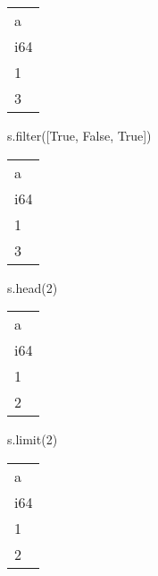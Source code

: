 \documentclass[
  letterpaper,
  DIV=11,
  numbers=noendperiod]{scrartcl}
\newenvironment{Shaded}{\begin{snugshade}}{\end{snugshade}}
\newcommand{\BuiltInTok}[1]{\textcolor[rgb]{0.00,0.23,0.31}{#1}}
\newcommand{\DecValTok}[1]{\textcolor[rgb]{0.68,0.00,0.00}{#1}}
\newcommand{\NormalTok}[1]{\textcolor[rgb]{0.00,0.23,0.31}{#1}}
\newcommand{\VariableTok}[1]{\textcolor[rgb]{0.07,0.07,0.07}{#1}}
\begin{document}
\begin{longtable}[]{@{}l@{}}
\toprule()
a \\
i64 \\
\midrule()
\endhead
1 \\
3 \\
\bottomrule()
\end{longtable}

\begin{Shaded}
\begin{Highlighting}[]
\NormalTok{s.}\BuiltInTok{filter}\NormalTok{([}\VariableTok{True}\NormalTok{, }\VariableTok{False}\NormalTok{, }\VariableTok{True}\NormalTok{])}
\end{Highlighting}
\end{Shaded}

\begin{longtable}[]{@{}l@{}}
\toprule()
a \\
i64 \\
\midrule()
\endhead
1 \\
3 \\
\bottomrule()
\end{longtable}

\begin{Shaded}
\begin{Highlighting}[]
\NormalTok{s.head(}\DecValTok{2}\NormalTok{)}
\end{Highlighting}
\end{Shaded}

\begin{longtable}[]{@{}l@{}}
\toprule()
a \\
i64 \\
\midrule()
\endhead
1 \\
2 \\
\bottomrule()
\end{longtable}

\begin{Shaded}
\begin{Highlighting}[]
\NormalTok{s.limit(}\DecValTok{2}\NormalTok{)}
\end{Highlighting}
\end{Shaded}

\begin{longtable}[]{@{}l@{}}
\toprule()
a \\
i64 \\
\midrule()
\endhead
1 \\
2 \\
\bottomrule()
\end{longtable}
\end{document}
